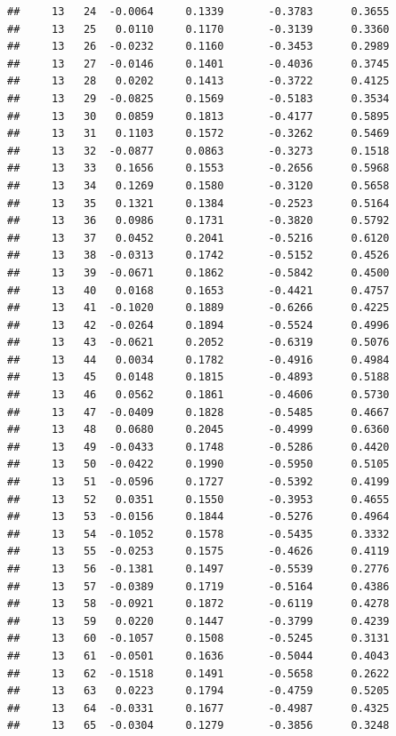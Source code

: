 \documentclass[
]{article}
\begin{document}
\begin{verbatim}
##     13   24  -0.0064     0.1339       -0.3783      0.3655 
##     13   25   0.0110     0.1170       -0.3139      0.3360 
##     13   26  -0.0232     0.1160       -0.3453      0.2989 
##     13   27  -0.0146     0.1401       -0.4036      0.3745 
##     13   28   0.0202     0.1413       -0.3722      0.4125 
##     13   29  -0.0825     0.1569       -0.5183      0.3534 
##     13   30   0.0859     0.1813       -0.4177      0.5895 
##     13   31   0.1103     0.1572       -0.3262      0.5469 
##     13   32  -0.0877     0.0863       -0.3273      0.1518 
##     13   33   0.1656     0.1553       -0.2656      0.5968 
##     13   34   0.1269     0.1580       -0.3120      0.5658 
##     13   35   0.1321     0.1384       -0.2523      0.5164 
##     13   36   0.0986     0.1731       -0.3820      0.5792 
##     13   37   0.0452     0.2041       -0.5216      0.6120 
##     13   38  -0.0313     0.1742       -0.5152      0.4526 
##     13   39  -0.0671     0.1862       -0.5842      0.4500 
##     13   40   0.0168     0.1653       -0.4421      0.4757 
##     13   41  -0.1020     0.1889       -0.6266      0.4225 
##     13   42  -0.0264     0.1894       -0.5524      0.4996 
##     13   43  -0.0621     0.2052       -0.6319      0.5076 
##     13   44   0.0034     0.1782       -0.4916      0.4984 
##     13   45   0.0148     0.1815       -0.4893      0.5188 
##     13   46   0.0562     0.1861       -0.4606      0.5730 
##     13   47  -0.0409     0.1828       -0.5485      0.4667 
##     13   48   0.0680     0.2045       -0.4999      0.6360 
##     13   49  -0.0433     0.1748       -0.5286      0.4420 
##     13   50  -0.0422     0.1990       -0.5950      0.5105 
##     13   51  -0.0596     0.1727       -0.5392      0.4199 
##     13   52   0.0351     0.1550       -0.3953      0.4655 
##     13   53  -0.0156     0.1844       -0.5276      0.4964 
##     13   54  -0.1052     0.1578       -0.5435      0.3332 
##     13   55  -0.0253     0.1575       -0.4626      0.4119 
##     13   56  -0.1381     0.1497       -0.5539      0.2776 
##     13   57  -0.0389     0.1719       -0.5164      0.4386 
##     13   58  -0.0921     0.1872       -0.6119      0.4278 
##     13   59   0.0220     0.1447       -0.3799      0.4239 
##     13   60  -0.1057     0.1508       -0.5245      0.3131 
##     13   61  -0.0501     0.1636       -0.5044      0.4043 
##     13   62  -0.1518     0.1491       -0.5658      0.2622 
##     13   63   0.0223     0.1794       -0.4759      0.5205 
##     13   64  -0.0331     0.1677       -0.4987      0.4325 
##     13   65  -0.0304     0.1279       -0.3856      0.3248 

\end{verbatim}
\end{document}

